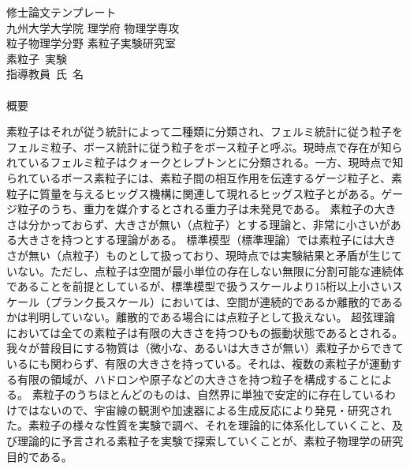 
\begin{center}
\thispagestyle{empty}
{\Large 修士論文テンプレート}\\
九州大学大学院 理学府 物理学専攻 \\ 粒子物理学分野 素粒子実験研究室 \\
素粒子\ 実験 \\[1ex] 指導教員\ 氏\ 名\\ 　 \\
\fi
{\huge 概要}\\
\end{center}

素粒子はそれが従う統計によって二種類に分類され、フェルミ統計に従う粒子をフェルミ粒子、ボース統計に従う粒子をボース粒子と呼ぶ。現時点で存在が知られているフェルミ粒子はクォークとレプトンとに分類される。一方、現時点で知られているボース素粒子には、素粒子間の相互作用を伝達するゲージ粒子と、素粒子に質量を与えるヒッグス機構に関連して現れるヒッグス粒子とがある。ゲージ粒子のうち、重力を媒介するとされる重力子は未発見である。
素粒子の大きさは分かっておらず、大きさが無い（点粒子）とする理論と、非常に小さいがある大きさを持つとする理論がある。
標準模型（標準理論）では素粒子には大きさが無い（点粒子）ものとして扱っており、現時点では実験結果と矛盾が生じていない。ただし、点粒子は空間が最小単位の存在しない無限に分割可能な連続体であることを前提としているが、標準模型で扱うスケールより15桁以上小さいスケール（プランク長スケール）においては、空間が連続的であるか離散的であるかは判明していない。離散的である場合には点粒子として扱えない。
超弦理論においては全ての素粒子は有限の大きさを持つひもの振動状態であるとされる。
我々が普段目にする物質は（微小な、あるいは大きさが無い）素粒子からできているにも関わらず、有限の大きさを持っている。それは、複数の素粒子が運動する有限の領域が、ハドロンや原子などの大きさを持つ粒子を構成することによる。
素粒子のうちほとんどのものは、自然界に単独で安定的に存在しているわけではないので、宇宙線の観測や加速器による生成反応により発見・研究された。素粒子の様々な性質を実験で調べ、それを理論的に体系化していくこと、及び理論的に予言される素粒子を実験で探索していくことが、素粒子物理学の研究目的である。\cite{sample}
